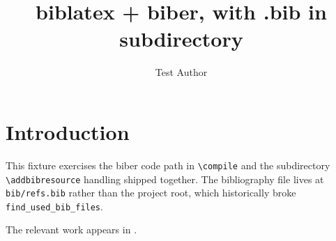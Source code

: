 \documentclass{article}
\title{biblatex + biber, with .bib in subdirectory}
\author{Test Author}
\begin{document}
\maketitle

\section{Introduction}
This fixture exercises the biber code path in \texttt{\textbackslash compile}
and the subdirectory \texttt{\textbackslash addbibresource} handling shipped
together. The bibliography file lives at \texttt{bib/refs.bib} rather than
the project root, which historically broke \texttt{find\_used\_bib\_files}.

The relevant work appears in \autocite{einstein1905, smith2020, doe2024}.

\printbibliography
\end{document}
